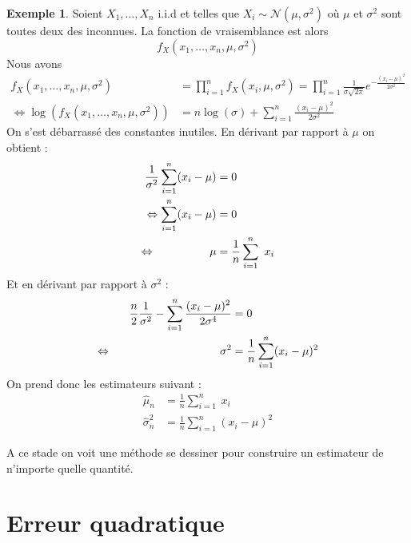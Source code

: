 \documentclass[a4paper,12pt]{report}
\theoremstyle{definition}
\renewcommand{\(}{\left(}
\renewcommand{\)}{\right)}
\newtheorem{exmp}[thm]{Exemple}
\begin{document}
        \begin{exmp}
            Soient $X_1,\dots,X_n$ i.i.d et telles que $X_i\sim \mathcal{N}(\mu,\sigma^2)$ où $\mu$ et $\sigma^2$ sont toutes deux des inconnues. La fonction de vraisemblance est alors
            $$f_X(x_1,\dots,x_n,\mu,\sigma^2)$$
            Nous avons
            \begin{align*}
                f_X(x_1,\dots,x_n,\mu,\sigma^2) &= \prod_{i=1}^n f_X(x_i,\mu,\sigma^2) = \prod_{i=1}^n \frac{1}{\sigma\sqrt{2\pi}}e^{- \frac{(x_i-\mu)^2}{2\sigma^2}} \\
                \Leftrightarrow \log(f_X(x_1,\dots,x_n,\mu,\sigma^2)) &= n\log(\sigma)+\sum_{i=1}^n \frac{(x_i-\mu)^2}{2\sigma^2}
            \end{align*}
            On s'est débarrassé des constantes inutiles.  En dérivant par rapport à $\mu$ on obtient :
            \begin{align*}
                \frac{1}{\sigma^2} \sum_{i=1}^n (x_i-\mu) &= 0 \\
                \Leftrightarrow \sum_{i=1}^n (x_i-\mu) &= 0 \\
                \Leftrightarrow\hspace{1.7cm} \mu &= \frac{1}{n} \sum_{i=1}^n ~x_i
            \end{align*}
            Et en dérivant par rapport à $\sigma^2$ :
            \begin{align*}
                \frac{n}{2}\frac{1}{\sigma^2}-\sum_{i=1}^n \frac{(x_i-\mu)^2}{2\sigma^4} &= 0 \\
                \Leftrightarrow \hspace{3.4cm}\sigma^2 &= \frac{1}{n} \sum_{i=1}^n (x_i-\mu)^2
            \end{align*}
            On prend donc les estimateurs suivant :
            \begin{align*}
                \hat{\mu}_n &= \frac{1}{n} \sum_{i=1}^n ~x_i \\
                \hat{\sigma}^2_n &= \frac{1}{n} \sum_{i=1}^n (x_i-\mu)^2
            \end{align*}
        \end{exmp}
        
        A ce stade on voit une méthode se dessiner pour construire un estimateur de n'importe quelle quantité.
        
        \section{Erreur quadratique}
    
\end{document}
